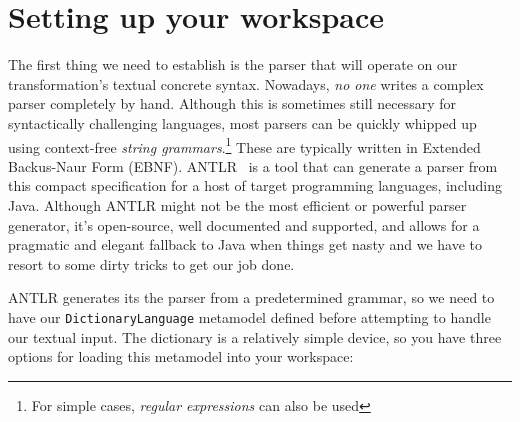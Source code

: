 \newpage
\section{Setting up your workspace}
\genHeader

The first thing we need to establish is the parser that will operate on our transformation's textual concrete syntax. Nowadays, \emph{no one} writes a complex
parser completely by hand. Although this is sometimes still necessary for syntactically challenging languages, most parsers can be quickly whipped up using
context-free \emph{string grammars}.\footnote{For simple cases, \emph{regular expressions} can also be used} These are typically written in Extended Backus-Naur
Form (EBNF). ANTLR~\cite{ANTLR} is a tool that can generate a parser from this compact specification for a host of target programming languages,
including Java. Although ANTLR might not be the most efficient or powerful parser generator, it's open-source, well documented and supported, and allows for a
pragmatic and elegant fallback to Java when things get nasty and we have to resort to some dirty tricks to get our job done.

\vspace{0.5cm}

ANTLR generates its the parser from a predetermined grammar, so we need to have our \texttt{DictionaryLanguage} metamodel defined before attempting to handle
our textual input. The dictionary is a relatively simple device, so you have three options for loading this metamodel into your workspace:


